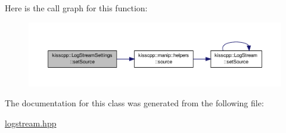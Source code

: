 Here is the call graph for this function\-:\nopagebreak
\begin{figure}[H]
\begin{center}
\leavevmode
\includegraphics[width=350pt]{classkisscpp_1_1_log_stream_settings_ac370b7ef8b02c76c2f0ddb7f9d2e1930_cgraph}
\end{center}
\end{figure}




The documentation for this class was generated from the following file\-:\begin{DoxyCompactItemize}
\item 
\hyperlink{logstream_8hpp}{logstream.\-hpp}\end{DoxyCompactItemize}
